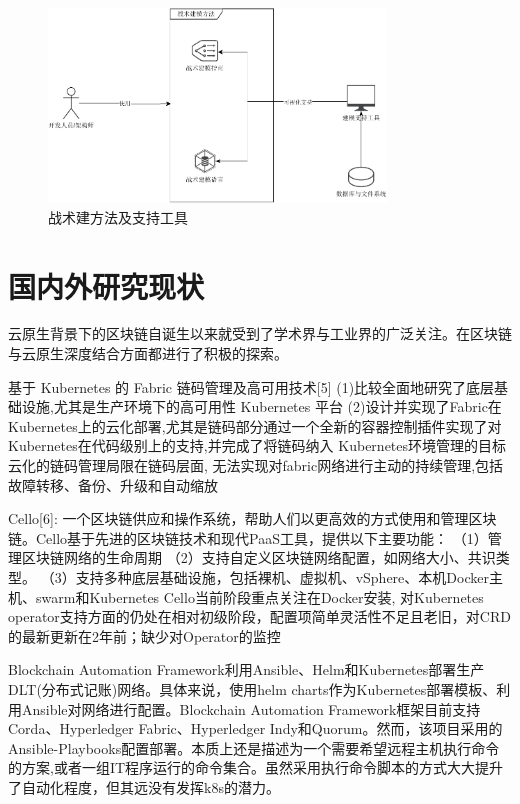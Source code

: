 \begin{figure}[h] %
    \centering %
    \includegraphics[width=0.8\textwidth]{FIGs/chapter1/workresult.pdf} %
    \caption{战术建方法及支持工具} %
    \label{workresult} %
\end{figure}%



\section{国内外研究现状}

云原生背景下的区块链自诞生以来就受到了学术界与工业界的广泛关注。在区块链与云原生深度结合方面都进行了积极的探索。

基于 Kubernetes 的 Fabric 链码管理及高可用技术[5]
(1)比较全面地研究了底层基础设施,尤其是生产环境下的高可用性 Kubernetes 平台
(2)设计并实现了Fabric在 Kubernetes上的云化部署,尤其是链码部分通过一个全新的容器控制插件实现了对 Kubernetes在代码级别上的支持,并完成了将链码纳入 Kubernetes环境管理的目标
云化的链码管理局限在链码层面, 无法实现对fabric网络进行主动的持续管理,包括故障转移、备份、升级和自动缩放

 Cello[6]: 一个区块链供应和操作系统，帮助人们以更高效的方式使用和管理区块链。Cello基于先进的区块链技术和现代PaaS工具，提供以下主要功能：
（1）管理区块链网络的生命周期
（2）支持自定义区块链网络配置，如网络大小、共识类型。
（3）支持多种底层基础设施，包括裸机、虚拟机、vSphere、本机Docker主机、swarm和Kubernetes
Cello当前阶段重点关注在Docker安装, 对Kubernetes operator支持方面的仍处在相对初级阶段，配置项简单灵活性不足且老旧，对CRD的最新更新在2年前；缺少对Operator的监控

Blockchain Automation Framework利用Ansible、Helm和Kubernetes部署生产DLT(分布式记账)网络。具体来说，使用helm charts作为Kubernetes部署模板、利用Ansible对网络进行配置。Blockchain Automation Framework框架目前支持Corda、Hyperledger Fabric、Hyperledger Indy和Quorum。然而，该项目采用的Ansible-Playbooks配置部署。本质上还是描述为一个需要希望远程主机执行命令的方案,或者一组IT程序运行的命令集合。虽然采用执行命令脚本的方式大大提升了自动化程度，但其远没有发挥k8s的潜力。

